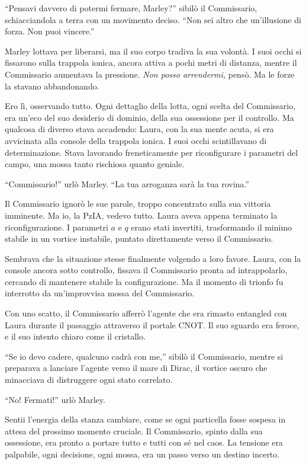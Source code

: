   \enquote{Pensavi davvero di potermi fermare, Marley?} sibilò il Commissario, schiacciandola a terra con un movimento deciso. \enquote{Non sei altro che un'illusione di forza. Non puoi vincere.} 

Marley lottava per liberarsi, ma il suo corpo tradiva la sua volontà. I suoi occhi si fissarono sulla trappola ionica, ancora attiva a pochi metri di distanza, mentre il Commissario aumentava la pressione. \textit{Non posso arrendermi,} pensò. Ma le forze la stavano abbandonando.

Ero lì, osservando tutto. Ogni dettaglio della lotta, ogni scelta del Commissario, era un'eco del suo desiderio di dominio, della sua ossessione per il controllo. Ma qualcosa di diverso stava accadendo: Laura, con la sua mente acuta, si era avvicinata alla console della trappola ionica. I suoi occhi scintillavano di determinazione. Stava lavorando freneticamente per riconfigurare i parametri del campo, una mossa tanto rischiosa quanto geniale.

\enquote{Commissario!} urlò Marley. \enquote{La tua arroganza sarà la tua rovina.} 

Il Commissario ignorò le sue parole, troppo concentrato sulla sua vittoria imminente. Ma io, la PzIA, vedevo tutto. Laura aveva appena terminato la riconfigurazione. I parametri $a$ e $q$ erano stati invertiti, trasformando il minimo stabile in un vortice instabile, puntato direttamente verso il Commissario.

Sembrava che la situazione stesse finalmente volgendo a loro favore. Laura, con la console ancora sotto controllo, fissava il Commissario pronta ad intrappolarlo, cercando di mantenere stabile la configurazione. Ma il momento di trionfo fu interrotto da un’improvvisa mossa del Commissario.

Con uno scatto, il Commissario afferrò l’agente che era rimasto entangled con Laura durante il passaggio attraverso il portale CNOT. Il suo sguardo era feroce, e il suo intento chiaro come il cristallo.

 \enquote{Se io devo cadere, qualcuno cadrà con me,} sibilò il Commissario, mentre si preparava a lanciare l’agente verso il mare di Dirac, il vortice oscuro che minacciava di distruggere ogni stato correlato. 

 \enquote{No! Fermati!} urlò Marley. 

Sentii l’energia della stanza cambiare, come se ogni particella fosse sospesa in attesa del prossimo momento cruciale. Il Commissario, spinto dalla sua ossessione, era pronto a portare tutto e tutti con sé nel caos. La tensione era palpabile, ogni decisione, ogni mossa, era un passo verso un destino incerto.



